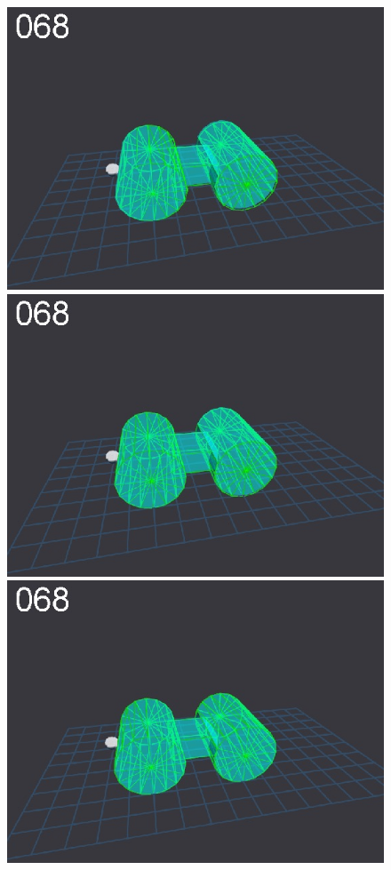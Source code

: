 \begin{figure}[t]
{\includegraphics[width=\imgCXwid]{./C5_1exp_6_1}
\includegraphics[width=\imgCXwid]{./C5_2exp_6_1}
\includegraphics[width=\imgCXwid]{./C5_3exp_6_1}
}
\end{figure}
